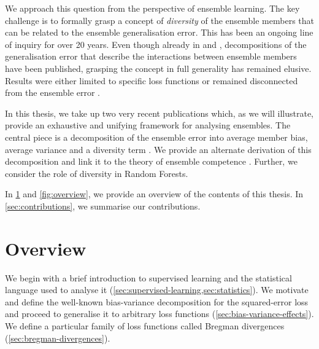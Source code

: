 \documentclass[
	twoside=false, %
]{kaobook}
\begin{document}
We approach this question from the perspective of ensemble learning. The key challenge is to formally grasp a concept of \textit{diversity} of the ensemble members that can be related to the ensemble generalisation error.
This has been an ongoing line of inquiry for over 20 years. 
Even though already in \citeyear{krogh_NeuralNetworkEnsembles_1995} and \citeyear{ueda_GeneralizationErrorEnsemble_1996}, decompositions of the generalisation error that describe the interactions between ensemble members have been published, grasping the concept in full generality has remained elusive. Results were either limited to specific loss functions or remained disconnected from the ensemble error \cite{kuncheva_MeasuresDiversityClassifier_2003}.

In this thesis, we take up two very recent publications 
\cite{wood_UnifiedTheoryDiversity_2023, theisen_WhenAreEnsembles_2023}
which, as we will illustrate, provide an exhaustive and unifying framework for analysing ensembles. The central piece is a decomposition of the ensemble error into average member bias, average variance and a diversity term \cite{wood_UnifiedTheoryDiversity_2023}.
We provide an alternate derivation of this decomposition and link it to the theory of ensemble competence \cite{theisen_WhenAreEnsembles_2023}. Further, we consider the role of diversity in Random Forests.

In \cref{sec:overview} and \cref{fig:overview}, we provide an overview of the contents of this thesis. In \cref{sec:contributions}, we summarise our contributions.



\section{Overview}
\label{sec:overview}

We begin with a brief introduction to supervised learning and the statistical language used to analyse it
(\cf \cref{sec:supervised-learning,sec:statistics}). We motivate and define the well-known bias-variance decomposition for the squared-error loss and proceed to generalise it to arbitrary loss functions
(\cf \cref{sec:bias-variance-effects}).  
We define a particular family of loss functions called Bregman divergences
(\cf \cref{sec:bregman-divergences}).
\end{document}
